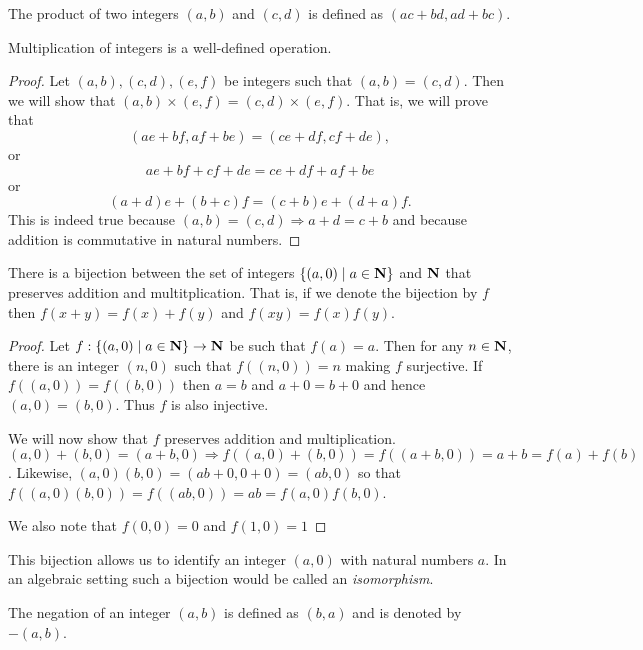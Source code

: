 \begin{defn}\label{c3s1d3}
The product of two integers $(a, b)$ and $(c, d)$ is defined as $(ac + bd,
ad + bc)$.
\end{defn}

\begin{lem}\label{c3s3l3}
Multiplication of integers is a well-defined operation.
\end{lem}
\begin{proof}
Let $(a, b), (c, d), (e, f)$ be integers such that $(a, b) = (c, d)$. Then
we will show that $(a, b) \times (e, f) = (c, d) \times (e, f)$. That is,
we will prove that
\[
(ae + bf, af + be) = (ce + df, cf + de),
\]
or
\[
ae + bf + cf + de = ce + df + af + be
\]
or
\[
(a + d)e + (b + c)f = (c + b)e + (d + a)f.
\]
This is indeed true because $(a, b) = (c, d) \Rightarrow a + d = c + b$ and
because addition is commutative in natural numbers.
\end{proof}

\begin{lem}\label{c3s1l4}
There is a bijection between the set of integers $\{(a, 0) \;|\; a \in 
\mathbf{N}\}$ and $\mathbf{N}$ that preserves addition and multitplication. That is, 
if we denote the bijection by $f$ then $f(x + y) = f(x) + f(y)$ and $f(xy)
= f(x)f(y)$.
\end{lem}
\begin{proof}
Let $f: \{(a, 0) \;|\; a \in \mathbf{N}\} \rightarrow \mathbf{N}$ be such that $f(a) =
a$. Then for any $n \in \mathbf{N}$, there is an integer $(n, 0)$ such that
$f((n, 0)) = n$ making $f$ surjective. If $f((a, 0)) = f((b, 0))$ then
$a = b$ and $a + 0 = b + 0$ and hence $(a, 0) = (b, 0)$. Thus $f$ is also
injective.

We will now show that $f$ preserves addition and multiplication. $(a, 0) +
(b, 0) = (a + b, 0) \Rightarrow f((a, 0) + (b, 0)) = f((a+b,0)) = a+b
= f(a) + f(b)$. Likewise, $(a, 0)(b, 0) = (ab+0,0+0)=(ab,0)$ so that
$f((a, 0)(b, 0)) = f((ab, 0)) = ab = f(a, 0)f(b, 0)$.

We also note that $f(0, 0) = 0$ and $f(1, 0) = 1$
\end{proof}

This bijection allows us to identify an integer $(a, 0)$ with natural 
numbers $a$. In an algebraic setting such a bijection would be called an
\emph{isomorphism}.

\begin{defn}\label{c3s1d4}
The negation of an integer $(a, b)$ is defined as $(b, a)$ and is denoted
by $-(a, b)$.
\end{defn}

